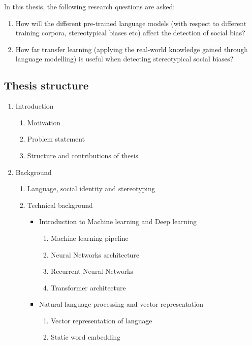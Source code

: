 In this thesis, the following research questions are asked:
\begin{enumerate}
    \item How will the different pre-trained language models (with respect to different training corpora, stereotypical biases etc) affect the detection of social bias?
    \item How far transfer learning (applying the real-world knowledge gained through language modelling) is useful when detecting stereotypical social biases?
\end{enumerate}

\subsection{Thesis structure}
\begin{enumerate}
    \item Introduction
        \begin{enumerate}
            \item Motivation
            \item Problem statement
            \item Structure and contributions of thesis
        \end{enumerate}
    \item Background
        \begin{enumerate}
        \item Language, social identity and stereotyping
        \item Technical background
        \begin{itemize}
            \item Introduction to Machine learning and Deep learning 
                \begin{enumerate}
                    \item Machine learning pipeline
                    \item Neural Networks architecture
                    \item Recurrent Neural Networks
                    \item Transformer architecture
                \end{enumerate}
            \item Natural language processing and vector representation
                \begin{enumerate}
                    \item Vector representation of language 
                    \item Static word embedding

\end{enumerate}
\end{itemize}
\end{enumerate}
\end{enumerate}
